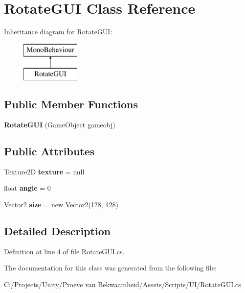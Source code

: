 \hypertarget{class_rotate_g_u_i}{\section{Rotate\+G\+U\+I Class Reference}
\label{class_rotate_g_u_i}
}
Inheritance diagram for Rotate\+G\+U\+I\+:\begin{figure}[H]
\begin{center}
\leavevmode
\includegraphics[height=2.000000cm]{class_rotate_g_u_i}
\end{center}
\end{figure}
\subsection*{Public Member Functions}
\begin{DoxyCompactItemize}
\item 
\hypertarget{class_rotate_g_u_i_ae8e7588323f5a87a6bf5bf17aa467a9c}{{\bfseries Rotate\+G\+U\+I} (Game\+Object gameobj)}\label{class_rotate_g_u_i_ae8e7588323f5a87a6bf5bf17aa467a9c}

\end{DoxyCompactItemize}
\subsection*{Public Attributes}
\begin{DoxyCompactItemize}
\item 
\hypertarget{class_rotate_g_u_i_a99ba2952cb01bdf28171f04f3f339683}{Texture2\+D {\bfseries texture} = null}\label{class_rotate_g_u_i_a99ba2952cb01bdf28171f04f3f339683}

\item 
\hypertarget{class_rotate_g_u_i_a018bfaff1e804ba93d39c81b142f2f6b}{float {\bfseries angle} = 0}\label{class_rotate_g_u_i_a018bfaff1e804ba93d39c81b142f2f6b}

\item 
\hypertarget{class_rotate_g_u_i_a75558c35bc8468bcbb21fcb488a5de4a}{Vector2 {\bfseries size} = new Vector2(128, 128)}\label{class_rotate_g_u_i_a75558c35bc8468bcbb21fcb488a5de4a}

\end{DoxyCompactItemize}


\subsection{Detailed Description}


Definition at line 4 of file Rotate\+G\+U\+I.\+cs.



The documentation for this class was generated from the following file\+:\begin{DoxyCompactItemize}
\item 
C\+:/\+Projects/\+Unity/\+Proeve van Bekwaamheid/\+Assets/\+Scripts/\+U\+I/Rotate\+G\+U\+I.\+cs\end{DoxyCompactItemize}
